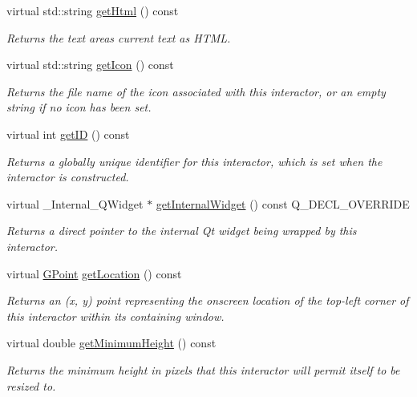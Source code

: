 \begin{DoxyCompactItemize}
virtual std\+::string \mbox{\hyperlink{classGTextArea_a58d3b7767e049484e3d7507379e6ecc7}{get\+Html}} () const
\begin{DoxyCompactList}\small\item\em Returns the text area\textquotesingle{}s current text as H\+T\+ML. \end{DoxyCompactList}\item 
virtual std\+::string \mbox{\hyperlink{classGInteractor_aaed62a73004939a64da6f0eb9eb64d73}{get\+Icon}} () const
\begin{DoxyCompactList}\small\item\em Returns the file name of the icon associated with this interactor, or an empty string if no icon has been set. \end{DoxyCompactList}\item 
virtual int \mbox{\hyperlink{classGInteractor_a9c9659a6c6ba66b4107ba59c95a24241}{get\+ID}} () const
\begin{DoxyCompactList}\small\item\em Returns a globally unique identifier for this interactor, which is set when the interactor is constructed. \end{DoxyCompactList}\item 
virtual \+\_\+\+Internal\+\_\+\+Q\+Widget $\ast$ \mbox{\hyperlink{classGTextArea_a208ce13c1da40bf0ddb509daf99d6588}{get\+Internal\+Widget}} () const Q\+\_\+\+D\+E\+C\+L\+\_\+\+O\+V\+E\+R\+R\+I\+DE
\begin{DoxyCompactList}\small\item\em Returns a direct pointer to the internal Qt widget being wrapped by this interactor. \end{DoxyCompactList}\item 
virtual \mbox{\hyperlink{classGPoint}{G\+Point}} \mbox{\hyperlink{classGInteractor_a4f83802015511edeb63b892830812c11}{get\+Location}} () const
\begin{DoxyCompactList}\small\item\em Returns an (x, y) point representing the onscreen location of the top-\/left corner of this interactor within its containing window. \end{DoxyCompactList}\item 
virtual double \mbox{\hyperlink{classGInteractor_aed4b0075fcc434499c3cb3e46896bda3}{get\+Minimum\+Height}} () const
\begin{DoxyCompactList}\small\item\em Returns the minimum height in pixels that this interactor will permit itself to be resized to. \end{DoxyCompactList}\item 

\end{DoxyCompactItemize}
